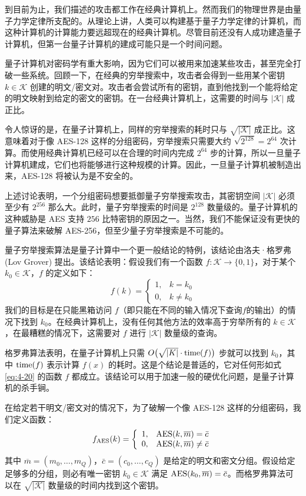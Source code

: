 到目前为止，我们描述的攻击都工作在经典计算机上。然而我们的物理世界是由量子力学定律所支配的。从理论上讲，人类可以构建基于量子力学定律的计算机，而这种计算机的计算能力要远超现在的经典计算机。尽管目前还没有人成功建造量子计算机，但第一台量子计算机的建成可能只是一个时间问题。

量子计算机对密码学有重大影响，因为它们可以被用来加速某些攻击，甚至完全打破一些系统。回顾一下，在经典的穷举搜索中，攻击者会得到一些用某个密钥 $k\in\mathcal{K}$ 创建的明文/密文对。攻击者会尝试所有的密钥，直到他找到一个能将给定的明文映射到给定的密文的密钥。在一台经典计算机上，这需要的时间与 $|\mathcal{K}|$ 成正比。


\begin{snote}[量子穷举搜索。]
令人惊讶的是，在量子计算机上，同样的穷举搜索的耗时只与 $\sqrt{|\mathcal{K}|}$ 成正比。这意味着对于像 AES-128 这样的分组密码，穷举搜索只需要大约 $\sqrt{2^{128}}=2^{64}$ 次计算。而使用经典计算机已经可以在合理的时间内完成 $2^{64}$ 步的计算，所以一旦量子计算机建成，它们也将能够进行这种规模的计算。因此，一旦量子计算机被制造出来，AES-128 将被认为是不安全的。

上述讨论表明，一个分组密码想要抵御量子穷举搜索攻击，其密钥空间 $|\mathcal{K}|$ 必须至少有 $2^{256}$ 那么大。此时，量子穷举搜索的时间是 $2^{128}$ 数量级的。量子计算机的这种威胁是 AES 支持 $256$ 比特密钥的原因之一。当然，我们不能保证没有更快的量子算法来破解 AES-256，但至少量子穷举搜索是不可能的。
\end{snote}

\begin{snote}[格罗弗算法。]
量子穷举搜索算法是量子计算中一个更一般结论的特例，该结论由洛夫·格罗弗 (Lov Grover) 提出。该结论表明：假设我们有一个函数 $f:\mathcal{K}\to\{0,1\}$，对于某个 $k_0\in\mathcal{K}$，$f$ 的定义如下：
\begin{equation}\label{eq:4-20}
f(k)=\left\{
\begin{array}{ll}
1, & k=k_0\\
0, & k\neq k_0
\end{array}
\right.
\end{equation}
我们的目标是在只能黑箱访问 $f$（即只能在不同的输入情况下查询$f$的输出）的情况下找到 $k_0$。在经典计算机上，没有任何其他方法的效率高于穷举所有的 $k\in\mathcal{K}$，在最糟糕的情况下，这需要对 $f$ 进行 $|\mathcal{K}|$ 数量级的查询。

格罗弗算法表明，在量子计算机上只需 $O\big(\sqrt{|K|}\cdot{\rm time}(f)\big)$ 步就可以找到 $k_0$，其中 ${\rm time}(f)$ 表示计算 $f(x)$ 的耗时。这是个结论是普适的，它对任何形如式 \ref{eq:4-20} 的函数 $f$ 都成立。该结论可以用于加速一般的硬优化问题，是量子计算机的杀手锏。

在给定若干明文/密文对的情况下，为了破解一个像 AES-128 这样的分组密码，我们定义函数：
\[
f_{\rm AES}(k)=\left\{
\begin{array}{ll}
1, & {\rm AES}(k,\overline m)=\bar c\\
0, & {\rm AES}(k,\overline m)\neq\bar c
\end{array}
\right.
\]
其中 $\overline m=(m_0,\dots,m_Q)$，$\bar c=(c_0,\dots,c_Q)$ 是给定的明文和密文分组。假设给定足够多的分组，则必有唯一密钥 $k_0\in\mathcal{K}$ 满足 ${\rm AES}(k_0,\overline m)=\bar c$。而格罗弗算法可以在 $\sqrt{|\mathcal{K}|}$ 数量级的时间内找到这个密钥。
\end{snote}